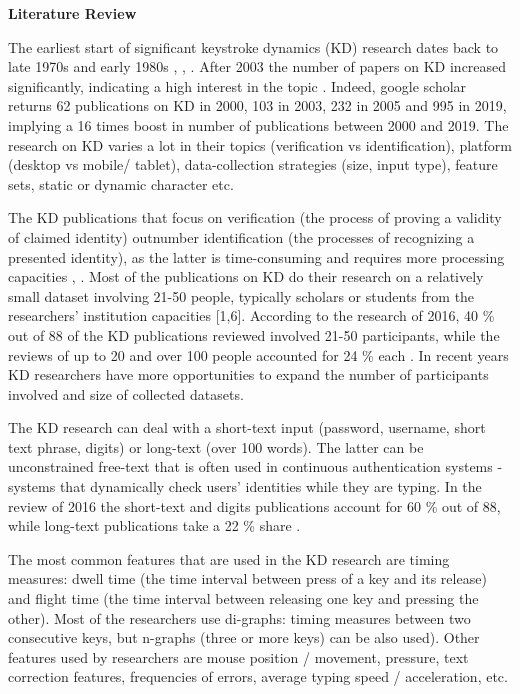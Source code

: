 \documentclass[12pt,a4]{article}
\begin{document}
\bigskip

\large\textbf{Literature Review}
\bigskip

\normalsize
The earliest start of significant keystroke dynamics (KD) research dates back to late 1970s and early 1980s \cite{Teh:2013}, \cite{Liakat:2017}, \cite{killourhy2009comparing}. After 2003 the number of papers on KD increased significantly, indicating a high interest in the topic \cite{Teh:2013}. Indeed, google scholar returns 62 publications on KD in 2000, 103 in 2003, 232 in 2005 and 995 in 2019, implying a 16 times boost in number of publications between 2000 and 2019. The research on KD varies a lot in their topics (verification vs identification), platform (desktop vs mobile/ tablet), data-collection strategies (size, input type), feature sets, static or dynamic character etc.

The KD publications that focus on verification (the process of proving a validity of claimed identity) outnumber identification (the processes of recognizing a presented identity), as the latter is time-consuming and requires more processing capacities \cite{Teh:2013}, \cite{banerjee2014_emnlp}. Most of the publications on KD do their research on a relatively small dataset involving 21-50 people, typically scholars or students from the researchers’ institution capacities [1,6]. According to the research of 2016, 40 \% out of 88 of the KD publications reviewed involved 21-50 participants, while the reviews of up to 20 and over 100 people accounted for 24 \% each \cite{Liakat:2017}. In recent years KD researchers have more opportunities to expand the number of participants involved and size of collected datasets.

The KD research can deal with a short-text input (password, username, short text phrase, digits) or long-text (over 100 words). The latter can be unconstrained free-text that is often used in continuous authentication systems - systems that dynamically check users’ identities while they are typing. In the review of 2016 the short-text and digits publications account for 60 \% out of 88, while long-text publications take a 22 \% share \cite{Liakat:2017}.

The most common features that are used in the KD research are timing measures: dwell time (the time interval between press of a key and its release) and flight time (the time interval between releasing one key and pressing the other). Most of the researchers use di-graphs: timing measures between two consecutive keys, but n-graphs (three or more keys) can be also used). Other features used by researchers are mouse position / movement, pressure, text correction features, frequencies of errors, average typing speed / acceleration, etc.
\end{document}
